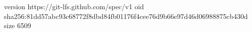 version https://git-lfs.github.com/spec/v1
oid sha256:81dd57abc93c68772f8dbd84fb01176f4cee76d9b66e97d46d06988875cb430d
size 6509
